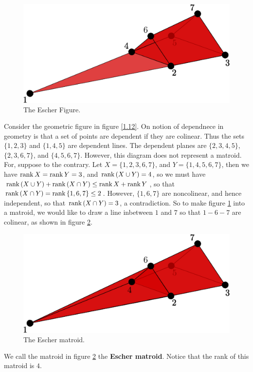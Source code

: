 \begin{example}\label{1.18}
    \begin{figure}[h]
        \centering
        \includegraphics[scale=0.8]{Figures/Chapter1/escher_matroid_1.eps}
        \caption{The Escher Figure.}
        \label{fig_1.12}
    \end{figure}
    Consider the geometric figure in figure \ref{1.12}. On notion of dependnece
    in geometry is that a set of points are dependent if they are colinear. Thus
    the sets $\{1,2,3\}$ and $\{1,4,5\}$ are dependent lines. The dependent
    planes are $\{2,3,4,5\}$, $\{2,3,6,7\}$, and $\{4,5,6,7\}$. However, this
    diagram does not represent a matroid. For, suppose to the contrary. Let
    $X=\{1,2,3,6,7\}$, and $Y=\{1,4,5,6,7\}$, then we have
    $\operatorname{rank}{X}=\operatorname{rank}{Y}=3$, and $\operatorname{rank}{(X \cup Y)}=4$, so we must have $\operatorname{rank}{(X
    \cup Y)}+\operatorname{rank}{(X \cap Y)} \leq \operatorname{rank}{X}+\operatorname{rank}{Y}$, so that $\operatorname{rank}{(X \cap
    Y)}=\operatorname{rank}{\{1,6,7\}} \leq 2$. However, $\{1,6,7\}$ are noncolinear, and
    hence independent, so that $\operatorname{rank}{(X \cap Y)}=3$, a contradiction. So to
    make figure \ref{fig_1.12} into a matroid, we would like to draw a line
    inbetween $1$ and  $7$ so that $1-6-7$ are colinear, as shown in figure
    \ref{fig_1.13}.
    \begin{figure}[h]
        \centering
        \includegraphics[scale=0.8]{Figures/Chapter1/escher_matroid_2.eps}
        \caption{The Escher matroid.}
        \label{fig_1.13}
    \end{figure}

    We call the matroid in figure \ref{fig_1.13} the \textbf{Escher matroid}.
    Notice that the rank of this matroid is $4$.
\end{example}


